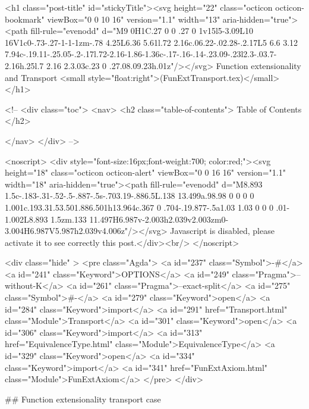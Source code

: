   

  <h1 class="post-title" id="stickyTitle"><svg height="22" class="octicon octicon-bookmark" viewBox="0 0 10 16" version="1.1" width="13" aria-hidden="true"><path fill-rule="evenodd" d="M9 0H1C.27 0 0 .27 0 1v15l5-3.09L10 16V1c0-.73-.27-1-1-1zm-.78 4.25L6.36 5.61l.72 2.16c.06.22-.02.28-.2.17L5 6.6 3.12 7.94c-.19.11-.25.05-.2-.17l.72-2.16-1.86-1.36c-.17-.16-.14-.23.09-.23l2.3-.03.7-2.16h.25l.7 2.16 2.3.03c.23 0 .27.08.09.23h.01z"/></svg> Function extensionality and Transport <small style="float:right">(FunExtTransport.tex)</small>
  </h1>

  <!-- 
  <div class="toc">
    <nav>
    <h2 class="table-of-contents"> Table of Contents </h2>
      

    </nav>
  </div>
   -->

  <noscript>
  <div style="font-size:16px;font-weight:700; color:red;"><svg height="18" class="octicon octicon-alert" viewBox="0 0 16 16" version="1.1" width="18" aria-hidden="true"><path fill-rule="evenodd" d="M8.893 1.5c-.183-.31-.52-.5-.887-.5s-.703.19-.886.5L.138 13.499a.98.98 0 0 0 0 1.001c.193.31.53.501.886.501h13.964c.367 0 .704-.19.877-.5a1.03 1.03 0 0 0 .01-1.002L8.893 1.5zm.133 11.497H6.987v-2.003h2.039v2.003zm0-3.004H6.987V5.987h2.039v4.006z"/></svg> Javascript is disabled, please activate it to see correctly this post.</div><br/>
  </noscript>

  <div class="hide" >
<pre class="Agda">
<a id="237" class="Symbol">{-#</a> <a id="241" class="Keyword">OPTIONS</a> <a id="249" class="Pragma">--without-K</a> <a id="261" class="Pragma">--exact-split</a> <a id="275" class="Symbol">#-}</a>
<a id="279" class="Keyword">open</a> <a id="284" class="Keyword">import</a> <a id="291" href="Transport.html" class="Module">Transport</a>
<a id="301" class="Keyword">open</a> <a id="306" class="Keyword">import</a> <a id="313" href="EquivalenceType.html" class="Module">EquivalenceType</a>
<a id="329" class="Keyword">open</a> <a id="334" class="Keyword">import</a> <a id="341" href="FunExtAxiom.html" class="Module">FunExtAxiom</a>
</pre>
</div>

## Function extensionality transport case

